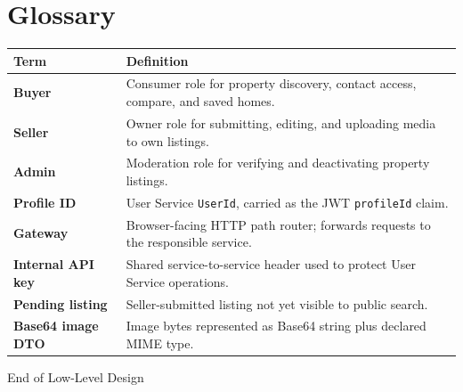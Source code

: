 \documentclass[10pt,a4paper]{article}
\newcommand{\field}[1]{\texttt{#1}}
\begin{document}
\section{Glossary}
\begin{tabularx}{\textwidth}{>{\bfseries}p{31mm} X}
\toprule
Term & Definition\\
\midrule
Buyer & Consumer role for property discovery, contact access, compare, and saved homes.\\
Seller & Owner role for submitting, editing, and uploading media to own listings.\\
Admin & Moderation role for verifying and deactivating property listings.\\
Profile ID & User Service \field{UserId}, carried as the JWT \field{profileId} claim.\\
Gateway & Browser-facing HTTP path router; forwards requests to the responsible service.\\
Internal API key & Shared service-to-service header used to protect User Service operations.\\
Pending listing & Seller-submitted listing not yet visible to public search.\\
Base64 image DTO & Image bytes represented as Base64 string plus declared MIME type.\\
\bottomrule
\end{tabularx}

\vfill
\begin{center}\small\color{ehgray}End of Low-Level Design\end{center}
\end{document}

